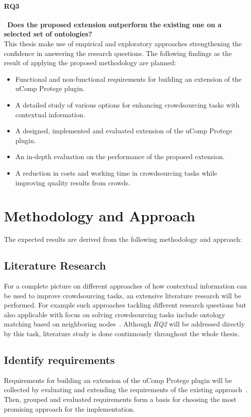 \documentclass[12pt, notitlepage]{article}
\begin{document}
\paragraph{RQ3}~\textbf{Does the proposed extension outperform the existing one on a selected set of ontologies?}\\
This thesis make use of empirical and exploratory approaches strengthening the confidence in answering the research questions. The following findings as the result of applying the proposed methodology are planned:
\begin{itemize}
	\item Functional and non-functional requirements for building an extension of the uComp Protege plugin.
	\item A detailed study of various options for enhancing crowdsourcing tasks with contextual information.
	\item A designed, implemented and evaluated extension of the uComp Protege plugin.
	\item An in-depth evaluation on the performance of the proposed extension.
	\item A reduction in costs and working time in crowdsourcing tasks while improving quality results from crowds.
\end{itemize}
\section{Methodology and Approach}
The expected results are derived from the following methodology and approach:
\subsection{Literature Research}
For a complete picture on different approaches of how contextual information can be used to improve crowdsourcing tasks, an extensive literature research will be performed. For example such approaches tackling different research questions but also applicable with focus on solving crowdsourcing tasks include ontology matching based on neighboring nodes~\cite{hoffmann2010context}. Although \emph{RQ2} will be addressed directly by this task, literature study is done continuously throughout the whole thesis. 
\subsection{Identify requirements}
Requirements for building an extension of the uComp Protege plugin will be collected by evaluating and extending the requirements of the existing approach~\cite{wohlgenannt2016crowd}. Then, grouped and evaluated requirements form a basis for choosing the most promising approach for the implementation.
\end{document}
